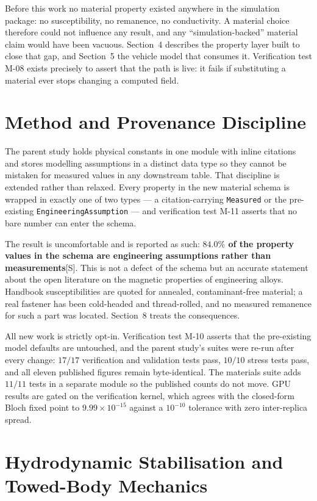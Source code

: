 \documentclass[11pt]{article}
\newcommand{\sig}{\textcolor{violet!70!black}{\footnotesize[S]}}
\begin{document}
Before this work no material property existed anywhere in the simulation
package: no susceptibility, no remanence, no conductivity. A material choice
therefore could not influence any result, and any ``simulation-backed'' material
claim would have been vacuous. Section~4 describes the property layer built to
close that gap, and Section~5 the vehicle model that consumes it. Verification
test M-08 exists precisely to assert that the path is live: it fails if
substituting a material ever stops changing a computed field.

\section{Method and Provenance Discipline}
The parent study holds physical constants in one module with inline citations
and stores modelling assumptions in a distinct data type so they cannot be
mistaken for measured values in any downstream table. That discipline is
extended rather than relaxed. Every property in the new material schema is
wrapped in exactly one of two types --- a citation-carrying \texttt{Measured} or
the pre-existing \texttt{EngineeringAssumption} --- and verification test M-11
asserts that no bare number can enter the schema.

The result is uncomfortable and is reported as such: \textbf{$84.0\%$ of the
property values in the schema are engineering assumptions rather than
measurements}\sig. This is not a defect of the schema but an accurate statement
about the open literature on the magnetic properties of engineering alloys.
Handbook susceptibilities are quoted for annealed, contaminant-free material;
a real fastener has been cold-headed and thread-rolled, and no measured
remanence for such a part was located. Section~8 treats the consequences.

All new work is strictly opt-in. Verification test M-10 asserts that the
pre-existing model defaults are untouched, and the parent study's suites were
re-run after every change: $17/17$ verification and validation tests pass,
$10/10$ stress tests pass, and all eleven published figures remain
byte-identical. The materials suite adds $11/11$ tests in a separate module so
the published counts do not move. GPU results are gated on the verification
kernel, which agrees with the closed-form Bloch fixed point to
$9.99\times10^{-15}$ against a $10^{-10}$ tolerance with zero inter-replica
spread.

\section{Hydrodynamic Stabilisation and Towed-Body Mechanics}
\end{document}

